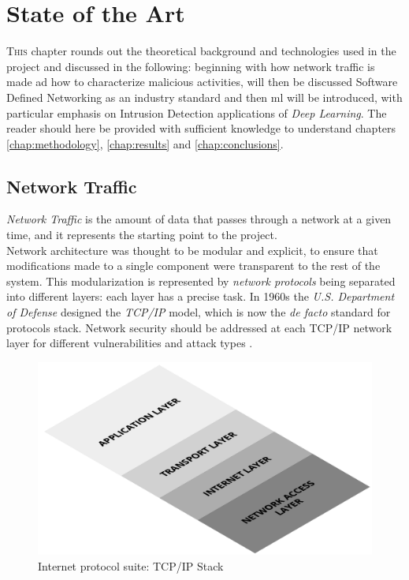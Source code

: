 \chapter{State of the Art}
\label{chap:state-of-the-art}

\lettrine[lines=3, findent=3pt, nindent=0pt]{T}{his} chapter rounds out the theoretical background and technologies used in the project and discussed in the following: beginning with how network traffic is made ad how to characterize malicious activities, will then be discussed Software Defined Networking as an industry standard and then \gls{ml} will be introduced, with particular emphasis on Intrusion Detection applications of \textit{Deep Learning}. The reader should here be provided with sufficient knowledge to understand chapters \ref{chap:methodology}, \ref{chap:results} and \ref{chap:conclusions}.


\section{Network Traffic}
\label{sec:network-traffic}

\textit{Network Traffic} is the amount of data that passes through a network at a given time, and it represents the starting point to the project. \\ Network architecture was thought to be modular and explicit, to ensure that modifications made to a single component were transparent to the rest of the system. This modularization is represented by \textit{network protocols} being separated into different layers: each layer has a precise task. In 1960s the \textit{U.S. Department of Defense} designed the \textit{TCP/IP} model, which is now the \textit{de facto} standard for protocols stack. Network security should be addressed at each TCP/IP network layer for different vulnerabilities and attack types \cite{Zaman2009}.

\begin{figure}[h!]
    \centering
    \includegraphics[scale=0.23]{assets/figures/chapter2/TCP_IP Stack.png}
    \caption{Internet protocol suite: TCP/IP Stack}
    \label{fig:TCP/IP-stack}
\end{figure}

